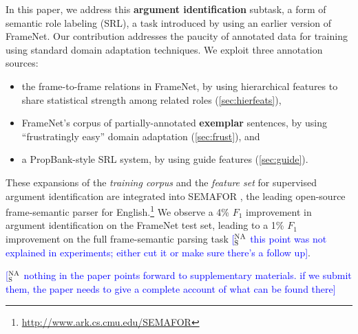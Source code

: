 \documentclass[11pt,a4paper]{article}
\newcommand{\ensuretext}[1]{#1}
\newcommand{\nasmarker}{\ensuretext{\textcolor{blue}{\ensuremath{^{\textsc{NA}}_{\textsc{S}}}}}}
\newcommand{\arkcomment}[3]{\ensuretext{\textcolor{#3}{[#1 #2]}}}
\newcommand{\nascomment}[1]{\arkcomment{\nasmarker}{#1}{blue}}
\begin{document}
In this paper, we address this \textbf{argument identification} 
subtask, a form of semantic role labeling (SRL), 
a task introduced by \citet{gildea-02} using an earlier version of FrameNet.
Our contribution addresses the paucity of annotated data for training 
using  standard domain
adaptation techniques.  We exploit three annotation sources:
\begin{itemize}
  \item the frame-to-frame relations in FrameNet, by using
  hierarchical features to share statistical strength among related roles
  (\cref{sec:hierfeats}),
  \item FrameNet's corpus of partially-annotated \textbf{exemplar} sentences,
  by using ``frustratingly easy'' domain adaptation (\cref{sec:frust}), and
  \item a PropBank-style SRL system, by using guide features (\cref{sec:guide}).
\end{itemize}
These expansions of the \emph{training corpus} and the \emph{feature set}
for supervised argument identification  are integrated into SEMAFOR
\citep{das-14},  the leading open-source frame-semantic parser for English.\footnote{\url{http://www.ark.cs.cmu.edu/SEMAFOR}} 
We observe a 4\% $F_1$ improvement in argument identification on the
FrameNet test set, leading to a 1\% $F_1$ improvement on the full
frame-semantic parsing task \nascomment{this point was not explained
  in experiments; either cut it or make sure there's a follow up}.

\nascomment{nothing in the paper points forward to supplementary
  materials.  if we submit them, the paper needs to give a complete
  account of what can be found there}
\end{document}
